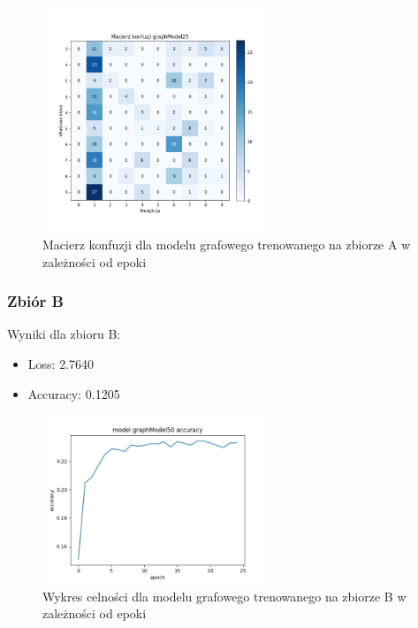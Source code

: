 \documentclass{article}
\begin{document}
\begin{figure}[H]
    \centering
    \includegraphics[width=0.6\textwidth]{img/graphModel25_confusion.png}
    \caption{Macierz konfuzji dla modelu grafowego trenowanego na zbiorze A w zależności od epoki} 
\end{figure}

\subsubsection{Zbiór B}

Wyniki dla zbioru B:
\begin{itemize}
    \item Loss: 2.7640
    \item Accuracy: 0.1205
\end{itemize}

\begin{figure}[H]
    \centering
    \includegraphics[width=0.6\textwidth]{img/graphModel50_acc.png}
    \caption{Wykres celności dla modelu grafowego trenowanego na zbiorze B w zależności od epoki} 
\end{figure}
\end{document}
